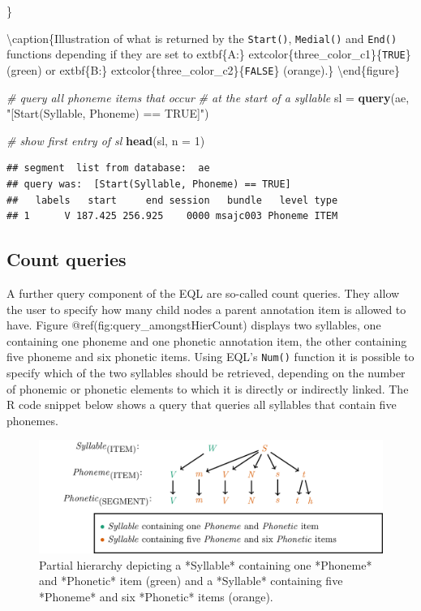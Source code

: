 \documentclass[]{book}
\newenvironment{Shaded}{\begin{snugshade}}{\end{snugshade}}
\newcommand{\CommentTok}[1]{\textcolor[rgb]{0.56,0.35,0.01}{\textit{#1}}}
\newcommand{\DataTypeTok}[1]{\textcolor[rgb]{0.13,0.29,0.53}{#1}}
\newcommand{\DecValTok}[1]{\textcolor[rgb]{0.00,0.00,0.81}{#1}}
\newcommand{\KeywordTok}[1]{\textcolor[rgb]{0.13,0.29,0.53}{\textbf{#1}}}
\newcommand{\NormalTok}[1]{#1}
\newcommand{\StringTok}[1]{\textcolor[rgb]{0.31,0.60,0.02}{#1}}
\begin{document}
\}

\textbackslash{}caption\{Illustration of what is returned by the \texttt{Start()}, \texttt{Medial()} and \texttt{End()} functions depending if they are set to extbf\{A:\} extcolor\{three\_color\_c1\}\{\texttt{TRUE}\} (green) or extbf\{B:\} extcolor\{three\_color\_c2\}\{\texttt{FALSE}\} (orange).\}\label{fig:query-positionSimple}
\textbackslash{}end\{figure\}

\begin{Shaded}
\begin{Highlighting}[]
\CommentTok{# query all phoneme items that occur}
\CommentTok{# at the start of a syllable}
\NormalTok{sl =}\StringTok{ }\KeywordTok{query}\NormalTok{(ae, }\StringTok{"[Start(Syllable, Phoneme) == TRUE]"}\NormalTok{)}

\CommentTok{# show first entry of sl}
\KeywordTok{head}\NormalTok{(sl, }\DataTypeTok{n =} \DecValTok{1}\NormalTok{)}
\end{Highlighting}
\end{Shaded}

\begin{verbatim}
## segment  list from database:  ae 
## query was:  [Start(Syllable, Phoneme) == TRUE] 
##   labels   start     end session   bundle   level type
## 1      V 187.425 256.925    0000 msajc003 Phoneme ITEM
\end{verbatim}

\hypertarget{subsec:query_countQueries}{%
\subsection{Count queries}\label{subsec:query_countQueries}}

A further query component of the EQL are so-called count queries. They allow the user to specify how many child nodes a parent annotation item is allowed to have. Figure @ref(fig:query\_amongstHierCount) displays two syllables, one containing one phoneme and one phonetic annotation item, the other containing five phoneme and six phonetic items. Using EQL's \texttt{Num()} function it is possible to specify which of the two syllables should be retrieved, depending on the number of phonemic or phonetic elements to which it is directly or indirectly linked. The R code snippet below shows a query that queries all syllables that contain five phonemes.

\begin{figure}

{\centering \includegraphics[width=0.75\linewidth]{pics/amongstHierCount} 

}

\caption{Partial hierarchy depicting a *Syllable* containing one *Phoneme* and  *Phonetic* item (green) and a *Syllable* containing five *Phoneme* and six *Phonetic* items (orange).}\label{fig:query-amongstHierCount}
\end{figure}
\end{document}
